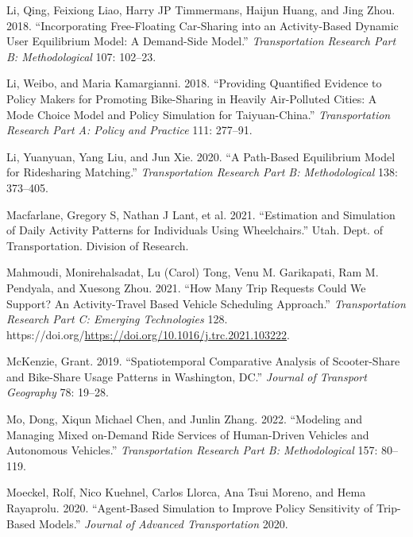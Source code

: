 \documentclass[12pt, oneside, openright]{byuthesis}
\newlength{\cslhangindent}
\newlength{\cslentryspacingunit} %
\newenvironment{CSLReferences}[2] %
 {%
  \setlength{\parindent}{0pt}
  \ifodd #1
  \let\oldpar\par
  \def\par{\hangindent=\cslhangindent\oldpar}
  \fi
  \setlength{\parskip}{#2\cslentryspacingunit}
 }%
 {}
\begin{document}
\begin{CSLReferences}{1}{0}
\leavevmode{}%
Li, Qing, Feixiong Liao, Harry JP Timmermans, Haijun Huang, and Jing Zhou. 2018. {``Incorporating Free-Floating Car-Sharing into an Activity-Based Dynamic User Equilibrium Model: A Demand-Side Model.''} \emph{Transportation Research Part B: Methodological} 107: 102--23.

\leavevmode{}%
Li, Weibo, and Maria Kamargianni. 2018. {``Providing Quantified Evidence to Policy Makers for Promoting Bike-Sharing in Heavily Air-Polluted Cities: A Mode Choice Model and Policy Simulation for Taiyuan-China.''} \emph{Transportation Research Part A: Policy and Practice} 111: 277--91.

\leavevmode{}%
Li, Yuanyuan, Yang Liu, and Jun Xie. 2020. {``A Path-Based Equilibrium Model for Ridesharing Matching.''} \emph{Transportation Research Part B: Methodological} 138: 373--405.

\leavevmode{}%
Macfarlane, Gregory S, Nathan J Lant, et al. 2021. {``Estimation and Simulation of Daily Activity Patterns for Individuals Using Wheelchairs.''} Utah. Dept. of Transportation. Division of Research.

\leavevmode{}%
Mahmoudi, Monirehalsadat, Lu (Carol) Tong, Venu M. Garikapati, Ram M. Pendyala, and Xuesong Zhou. 2021. {``How Many Trip Requests Could We Support? An Activity-Travel Based Vehicle Scheduling Approach.''} \emph{Transportation Research Part C: Emerging Technologies} 128. https://doi.org/\url{https://doi.org/10.1016/j.trc.2021.103222}.

\leavevmode{}%
McKenzie, Grant. 2019. {``Spatiotemporal Comparative Analysis of Scooter-Share and Bike-Share Usage Patterns in Washington, DC.''} \emph{Journal of Transport Geography} 78: 19--28.

\leavevmode{}%
Mo, Dong, Xiqun Michael Chen, and Junlin Zhang. 2022. {``Modeling and Managing Mixed on-Demand Ride Services of Human-Driven Vehicles and Autonomous Vehicles.''} \emph{Transportation Research Part B: Methodological} 157: 80--119.

\leavevmode{}%
Moeckel, Rolf, Nico Kuehnel, Carlos Llorca, Ana Tsui Moreno, and Hema Rayaprolu. 2020. {``Agent-Based Simulation to Improve Policy Sensitivity of Trip-Based Models.''} \emph{Journal of Advanced Transportation} 2020.


\end{CSLReferences}
\end{document}
